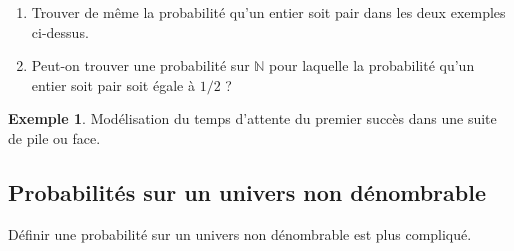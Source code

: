 \documentclass[french]{article}
\newcommand{\N}{\mathbb{N}}
\theoremstyle{plain}
\theoremstyle{definition}
\newtheorem*{ex}{Exemple}
\theoremstyle{remark}
\begin{document}
\begin{exo}
	\begin{enumerate}
		\item Trouver de même la probabilité qu'un entier soit pair dans les deux exemples ci-dessus.
		\item Peut-on trouver une probabilité sur 
		$\N$ pour laquelle la probabilité qu'un entier soit pair soit égale à $1/2$ ?
	\end{enumerate}
\end{exo}

\begin{ex}
	Modélisation du temps d'attente du premier succès dans une suite de pile ou face.
\end{ex}

\subsection{Probabilités sur un univers non dénombrable}

Définir une probabilité sur un univers non dénombrable est plus compliqué.
\end{document}
